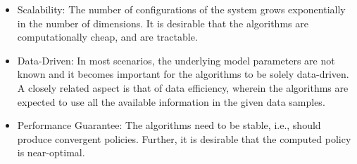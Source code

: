 \documentclass[onecolumn,12pt]{IEEEtran}
\begin{document}
\begin{itemize}%
\item Scalability: The number of configurations of the system grows exponentially in the number of dimensions.  It is desirable that the algorithms are computationally cheap, and are tractable. %
 \item Data-Driven: In most scenarios, the underlying model parameters are not known and it becomes important for the algorithms to be solely data-driven. A closely related aspect is that of data efficiency, wherein the algorithms are expected to use all the available information in the given data samples.
\item Performance Guarantee: The algorithms need to be stable, i.e., should produce convergent policies. Further, it is desirable that the computed policy is near-optimal.
\end{itemize}
\end{document}
